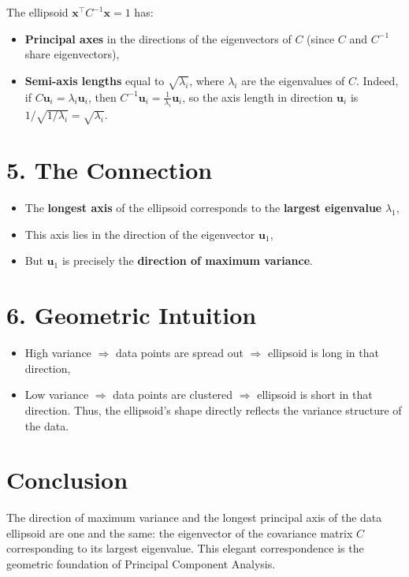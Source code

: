 \documentclass{article}
\begin{document}
The ellipsoid $ \mathbf{x}^\top C^{-1} \mathbf{x} = 1 $ has:

\begin{itemize}
\item \textbf{Principal axes} in the directions of the eigenvectors of $ C $ (since $ C $ and $ C^{-1} $ share eigenvectors),
    \item \textbf{Semi-axis lengths} equal to $ \sqrt{\lambda_i} $, where $ \lambda_i $ are the eigenvalues of $ C $.
Indeed, if $ C \mathbf{u}_i = \lambda_i \mathbf{u}_i $, then $ C^{-1} \mathbf{u}_i = \frac{1}{\lambda_i} \mathbf{u}_i $, so the axis length in direction $ \mathbf{u}_i $ is $ 1 / \sqrt{1/\lambda_i} = \sqrt{\lambda_i} $.
\end{itemize}

\section*{5. The Connection}

\begin{itemize}
\item The \textbf{longest axis} of the ellipsoid corresponds to the \textbf{largest eigenvalue} $ \lambda_1 $,
    \item This axis lies in the direction of the eigenvector $ \mathbf{u}_1 $,
    \item But $ \mathbf{u}_1 $ is precisely the \textbf{direction of maximum variance}.
\end{itemize}


\section*{6. Geometric Intuition}

\begin{itemize}
\item High variance $\Rightarrow$ data points are spread out $\Rightarrow$ ellipsoid is long in that direction,
    \item Low variance $\Rightarrow$ data points are clustered $\Rightarrow$ ellipsoid is short in that direction.
Thus, the ellipsoid's shape directly reflects the variance structure of the data.
\end{itemize}

\section*{Conclusion}

The direction of maximum variance and the longest principal axis of the data ellipsoid are one and the same: the eigenvector of the covariance matrix $ C $ corresponding to its largest eigenvalue. This elegant correspondence is the geometric foundation of Principal Component Analysis.
\end{document}
